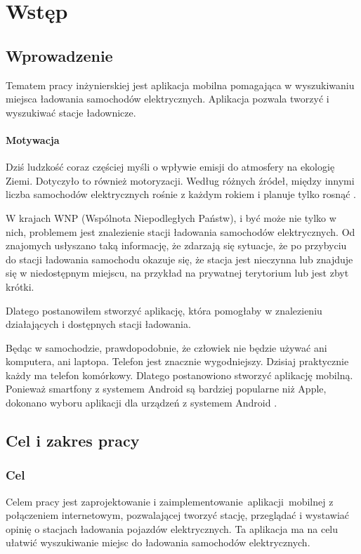 \chapter{Wstęp}

\section{Wprowadzenie}
Tematem pracy inżynierskiej jest aplikacja mobilna pomagająca w wyszukiwaniu miejsca ładowania samochodów elektrycznych.
Aplikacja pozwala tworzyć i wyszukiwać stacje ładownicze.

\subsubsection{Motywacja}
Dziś ludzkość coraz częściej myśli o wpływie emisji do atmosfery na ekologię Ziemi. Dotyczyło to również motoryzacji.
Według różnych źródeł, między innymi liczba samochodów elektrycznych rośnie z każdym rokiem i planuje tylko rosnąć \cite{iea1,mam1}.

W krajach WNP (Wspólnota Niepodległych Państw), i być może nie tylko w nich, problemem jest znalezienie stacji ładowania samochodów elektrycznych. Od znajomych usłyszano taką informację, że zdarzają się sytuacje,
że po przybyciu do stacji ładowania samochodu okazuje się, że stacja jest nieczynna lub znajduje się w niedostępnym miejscu, na przykład na prywatnej terytorium lub jest zbyt krótki.

Dlatego postanowiłem stworzyć aplikację, która pomogłaby w znalezieniu działających i dostępnych stacji ładowania.

Będąc w samochodzie, prawdopodobnie, że człowiek nie będzie używać ani komputera, ani laptopa. Telefon jest znacznie wygodniejszy. Dzisiaj praktycznie każdy ma telefon komórkowy.
Dlatego postanowiono stworzyć aplikację mobilną. Ponieważ smartfony z systemem Android są bardziej popularne niż Apple, dokonano wyboru aplikacji dla urządzeń z systemem Android \cite{avi1}.


\section{Cel i zakres pracy}
\subsection{Cel}
Celem pracy jest zaprojektowanie i zaimplementowanie aplikacji mobilnej z połączeniem internetowym,
pozwalającej tworzyć stację, przeglądać i wystawiać opinię o stacjach ładowania pojazdów elektrycznych.
Ta aplikacja ma na celu ułatwić wyszukiwanie miejsc do ładowania samochodów elektrycznych.

